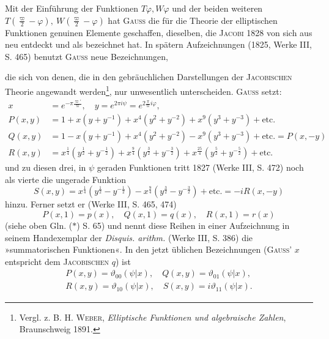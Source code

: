 Mit der Einführung der Funktionen \(T\varphi,W\varphi\) und der beiden weiteren\linebreak{}
\(T\left(\frac\varpi2-\varphi\right),\ W\left(\frac\varpi2-\varphi\right)\) hat \textsc{Gauss} die für die Theorie der elliptischen Funktionen genuinen Elemente geschaffen, dieselben, die \textsc{Jacobi} 1828 von sich aus
neu entdeckt und als  bezeichnet hat. In spätern Aufzeichnungen (1825, Werke III, S. 465) benutzt \textsc{Gauss} neue Bezeichnungen,\par
\clearpage{}
\noindent die sich von denen, die in den gebräuchlichen Darstellungen der \textsc{Jacobischen}
Theorie angewandt werden\footnote{Vergl. z. B. H. \textsc{Weber}, \textit{Elliptische Funktionen und algebraische Zahlen}, Braunschweig 1891.}, nur unwesentlich unterscheiden. \textsc{Gauss} setzt:
\[
\begin{aligned}
x&=e^{-\pi\frac{\varpi'}\varpi},\quad y=e^{2\pi i\psi}=e^{2\frac\pi\varpi i\varphi},\\
P(x,y)&=1+x(y+y^{-1})+x^4(y^2+y^{-2})+x^9(y^3+y^{-3})+\text{etc.}\\
Q(x,y)&=1-x(y+y^{-1})+x^4(y^2+y^{-2})-x^9(y^3+y^{-3})+\text{etc.}=P(x,-y)\\
R(x,y)&=x^{\frac14}(y^{\frac12}+y^{-\frac12})+x^{\frac94}(y^{\frac32}+y^{-\frac32})+x^{\frac{25}4}(y^{\frac52}+y^{-\frac52})+\text{etc.}
\end{aligned}
\]
\noindent und zu diesen drei, in \(\psi\) geraden Funktionen tritt 1827 (Werke III, S. 472)
noch als vierte die ungerade Funktion
\[
S(x,y)=x^{\frac14}(y^{\frac12}-y^{-\frac12})-x^{\frac94}(y^{\frac32}-y^{-\frac32})+\text{etc.}=-iR(x,-y)
\]
\noindent hinzu. Ferner setzt er (Werke III, S. 465, 474)
\[
P(x,1)=p(x),\quad Q(x,1)=q(x),\quad R(x,1)=r(x)
\]
\noindent (siehe oben Gln. (\(\ast\)) S. 65) und nennt diese Reihen in einer Aufzeichnung in
seinem Handexemplar der \textit{Disquis. arithm.} (Werke III, S. 386) die »summatorischen Funktionen«. In den jetzt üblichen Bezeichnungen (\textsc{Gauss'} \(x\) entspricht dem \textsc{Jacobischen} \(q\)) ist
\[
\begin{gathered}
P(x,y)=\vartheta_{00}(\psi|x),\quad Q(x,y)=\vartheta_{01}(\psi|x),\\
R(x,y)=\vartheta_{10}(\psi|x),\quad S(x,y)=i\vartheta_{11}(\psi|x).
\end{gathered}
\]
